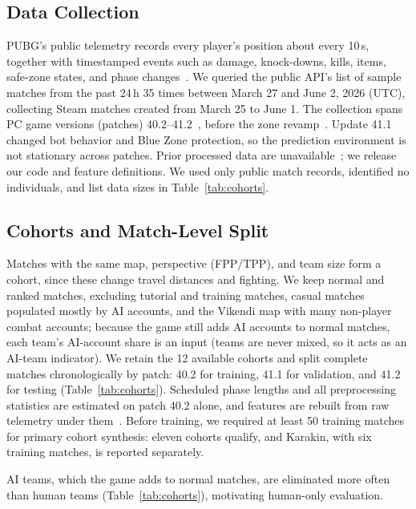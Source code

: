 \documentclass[sigconf,anonymous,nonacm]{acmart}
\begin{document}
\subsection{Data Collection}
\label{sec:method:data}
PUBG's public telemetry records every player's position about every 10\,s, together with timestamped events such as damage, knock-downs, kills, items, safe-zone states, and phase changes~\cite{PUBGAPI}.
We queried the public API's list of sample matches from the past 24\,h 35 times between March 27 and June 2, 2026 (UTC), collecting Steam matches created from March 25 to June 1.
The collection spans PC game versions (patches) 40.2--41.2~\cite{PUBGPatchNotes2026}, before the zone revamp~\cite{PUBGBlueZone2026}. Update 41.1 changed bot behavior and Blue Zone protection, so the prediction environment is not stationary across patches.
Prior processed data are unavailable~\cite{Sagong25a,KRAFTON}; we release our code and feature definitions.
We used only public match records, identified no individuals, and list data sizes in Table~\ref{tab:cohorts}.

\subsection{Cohorts and Match-Level Split}
\label{sec:method:cohort}
Matches with the same map, perspective (FPP/TPP), and team size form a cohort, since these change travel distances and fighting.
We keep normal and ranked matches, excluding tutorial and training matches, casual matches populated mostly by AI accounts, and the Vikendi map with many non-player combat accounts; because the game still adds AI accounts to normal matches, each team's AI-account share is an input (teams are never mixed, so it acts as an AI-team indicator).
We retain the 12 available cohorts and split complete matches chronologically by patch: 40.2 for training, 41.1 for validation, and 41.2 for testing (Table~\ref{tab:cohorts}). Scheduled phase lengths and all preprocessing statistics are estimated on patch 40.2 alone, and features are rebuilt from raw telemetry under them~\cite{Kaufman12}. Before training, we required at least 50 training matches for primary cohort synthesis: eleven cohorts qualify, and Karakin, with six training matches, is reported separately.

AI teams, which the game adds to normal matches, are eliminated more often than human teams (Table~\ref{tab:cohorts}), motivating human-only evaluation.
\end{document}
